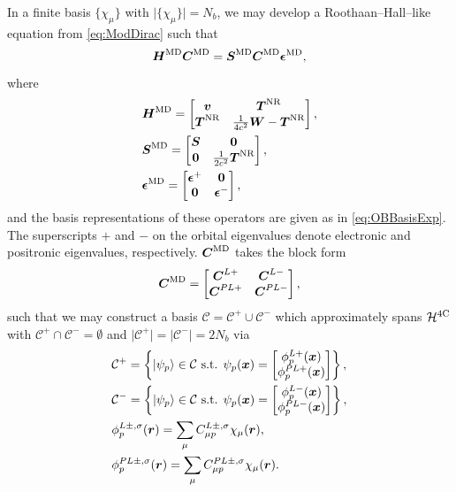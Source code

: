 In a finite basis $\{ \chi_\mu \}$ with $\vert \{\chi_\mu \} \vert = N_b$, we may develop a Roothaan--Hall--like equation from \cref{eq:ModDirac}
such that
\begin{equation}
\label{eq:MDRH}
\boldsymbol{H}^\mathrm{MD} \boldsymbol{C}^\mathrm{MD} = \boldsymbol{S}^\mathrm{MD} \boldsymbol{C}^\mathrm{MD} \boldsymbol{\epsilon}^\mathrm{MD},
\end{equation}
where
\begin{align}
&\vc H^\mathrm{MD} =
\begin{bmatrix}
\vc v & \vc T^\NR \\ \vc T^\NR & \frac{1}{4c^2} \vc W - \vc T^\NR
\end{bmatrix},\\
%
&\vc S^\mathrm{MD} =
\begin{bmatrix}
\vc S & \vc 0 \\ \vc 0 & \frac{1}{2c^2} \vc T^\NR
\end{bmatrix},\\
%
&\vc \epsilon^\mathrm{MD} =
\begin{bmatrix}
\vc \epsilon^+ & \vc 0 \\ \vc 0 & \vc \epsilon^-
\end{bmatrix},
\end{align}
and the basis representations of these operators are given as in \cref{eq:OBBasisExp}. The superscripts
$+$ and $-$ on the orbital eigenvalues denote electronic and positronic eigenvalues, respectively.
$\boldsymbol{C}^\mathrm{MD}$ takes the block form
\begin{equation}
\boldsymbol{C}^\mathrm{MD} = \begin{bmatrix} \boldsymbol{C}^{L+} & \boldsymbol{C}^{L-} \\ \boldsymbol{C}^{PL+} & \boldsymbol{C}^{PL-} \end{bmatrix},
\end{equation}
such that we may construct a basis $\mathcal C = \mathcal C^+ \cup \mathcal C^-$ which approximately spans $\mathcal{H}^{\mathrm{4C}}$
with $\mathcal C^+ \cap \mathcal C^- = \emptyset$ and $\vert \mathcal C^+ \vert = \vert \mathcal C^- \vert = 2N_b$ via
\begin{align}
&\mathcal C^+ = \left\lbrace \left\vert \psi_p \right\rangle \in \mathcal C \text{ s.t. } \psi_p(\boldsymbol{x}) = \begin{bmatrix} \phi_p^{L+}(\boldsymbol{x}) \\ \phi_p^{PL+}(\boldsymbol{x}) \end{bmatrix} \right\rbrace,\\
&\mathcal C^- = \left\lbrace \left\vert \psi_p \right\rangle \in \mathcal C \text{ s.t. } \psi_p(\boldsymbol{x}) = \begin{bmatrix} \phi_p^{L-}(\boldsymbol{x}) \\ \phi_p^{PL-}(\boldsymbol{x}) \end{bmatrix} \right\rbrace,\\
&\phi_p^{L\pm,\sigma}(\boldsymbol{r})  = \sum_\mu C^{L\pm,\sigma}_{\mu p} \chi_\mu(\boldsymbol{r}), \\
&\phi_p^{PL\pm,\sigma}(\boldsymbol{r}) = \sum_\mu C^{PL\pm,\sigma}_{\mu p} \chi_\mu(\boldsymbol{r}). 
\end{align}

